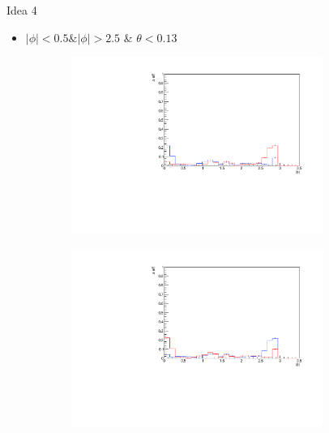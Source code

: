 \documentclass[11pt]{beamer}
\begin{document}
\begin{frame}{Idea 4}
\begin{itemize}
\item $|\phi| < 0.5 \& |\phi| > 2.5$ \& $\theta < 0.13$
\end{itemize}
\begin{figure}
\begin{subfigure}{0.45\textwidth}
\includegraphics[width=0.9\textwidth]{first/up_pdf/test_u/h_phi_test_SPi_combined.pdf}
\end{subfigure}
\begin{subfigure}{0.45\textwidth}
\includegraphics[width=0.9\textwidth]{first/down_pdf/test_d/h_phi_test_SPi_combined.pdf}
\end{subfigure}
\end{figure}
\end{frame}
\end{document}
